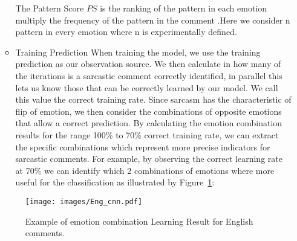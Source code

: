 \documentclass[12pt,a4paper]{report}
\theoremstyle{definition}
\begin{document}
\begin{CJK}{UTF8}{bsmi}
\begin{itemize}
\begin{itemize}
            \par The Pattern Score \(PS\) is the ranking of the pattern in each emotion multiply the frequency of the pattern in the comment .Here we consider n pattern in every emotion where n is experimentally defined.
            
            \item Training Prediction
            \newline
            When training the model, we use the training prediction as our observation source. We then calculate in how many of the iterations is a sarcastic comment correctly identified, in parallel this lets us know those that can be correctly learned by our model. We call this value the correct training rate.
            Since sarcasm has the characteristic of flip of emotion, we then consider the combinations of opposite emotions that allow a correct prediction.
            By calculating the emotion combination results for the range 100\% to 70\% correct training rate, we can extract the specific combinations which represent more precise indicators for sarcastic comments. For example, by observing the correct learning rate at 70\% we can identify which 2 combinations of emotions where more useful for the classification as illustrated by Figure~\ref{fig:learning}:
            \end{itemize}

            \begin{figure}[H]

                \texttt{[image: images/Eng\_cnn.pdf]}
                \caption{Example of emotion combination Learning Result for English comments.}
                \label{fig:learning}
            \end{figure}
            

\end{itemize}
\end{CJK}
\end{document}
